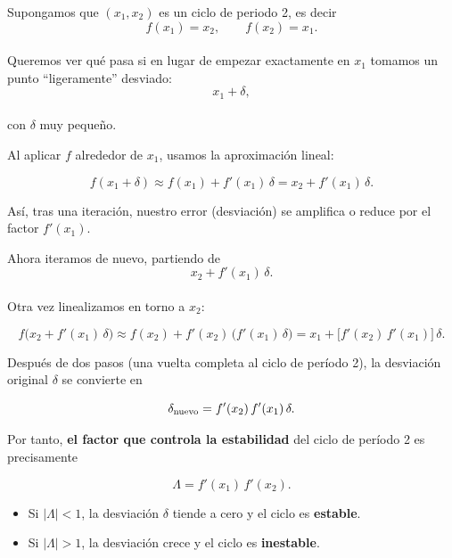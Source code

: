 \documentclass[
  10pt,
  a4paper,
  DIV=11,
  numbers=noendperiod,
  open=any]{scrreprt}
\providecommand{\tightlist}{%
  \setlength{\itemsep}{0pt}\setlength{\parskip}{0pt}}
\numberwithin{equation}{chapter}
\numberwithin{equation}{chapter}
\renewcommand{\[}{\begin{equation}}
\renewcommand{\]}{\end{equation}}
\begin{document}
Supongamos que \((x_1,x_2)\) es un ciclo de periodo 2, es decir\\
\[
f(x_1)=x_2,\qquad f(x_2)=x_1.
\]\\
Queremos ver qué pasa si en lugar de empezar exactamente en \(x_1\)
tomamos un punto ``ligeramente'' desviado:\\
\[
x_1 + \delta,
\]\\
con \(\delta\) muy pequeño.

Al aplicar \(f\) alrededor de \(x_1\), usamos la aproximación lineal:

\begin{equation}

f(x_1 + \delta)
\approx f(x_1) + f'(x_1)\,\delta
= x_2 + f'(x_1)\,\delta.

\end{equation}

Así, tras una iteración, nuestro error (desviación) se amplifica o
reduce por el factor \(f'(x_1)\).

Ahora iteramos de nuevo, partiendo de\\
\[
x_2 + f'(x_1)\,\delta.
\]\\
Otra vez linealizamos en torno a \(x_2\):

\begin{equation}

f\bigl(x_2 + f'(x_1)\,\delta\bigr)
\approx f(x_2) + f'(x_2)\,\bigl(f'(x_1)\,\delta\bigr)
= x_1 + \bigl[f'(x_2)\,f'(x_1)\bigr]\,\delta.

\end{equation}

Después de dos pasos (una vuelta completa al ciclo de período 2), la
desviación original \(\delta\) se convierte en

\begin{equation}

\delta_{\rm nuevo} = f'(x_2)\,f'(x_1)\,\delta.

\end{equation}

Por tanto, \textbf{el factor que controla la estabilidad} del ciclo de
período 2 es precisamente

\begin{equation}

\Lambda = f'(x_1)\,f'(x_2).

\end{equation}

\begin{itemize}
\tightlist
\item
  Si \(|\Lambda|<1\), la desviación \(\delta\) tiende a cero y el ciclo
  es \textbf{estable}.\\
\item
  Si \(|\Lambda|>1\), la desviación crece y el ciclo es
  \textbf{inestable}.
\end{itemize}
\end{document}
